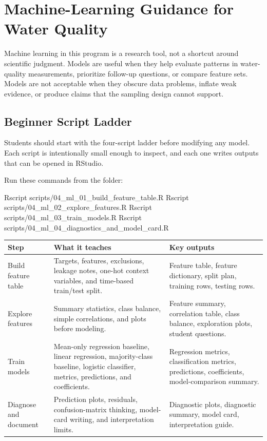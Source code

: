 \chapter{Machine-Learning Guidance for Water Quality}

Machine learning in this program is a research tool, not a shortcut around scientific judgment. Models are useful when they help evaluate patterns in water-quality measurements, prioritize follow-up questions, or compare feature sets. Models are not acceptable when they obscure data problems, inflate weak evidence, or produce claims that the sampling design cannot support.

\section{Beginner Script Ladder}

Students should start with the four-script ladder before modifying any model. Each script is intentionally small enough to inspect, and each one writes outputs that can be opened in RStudio.

Run these commands from the  folder:

\begin{rcode}
Rscript scripts/04_ml_01_build_feature_table.R
Rscript scripts/04_ml_02_explore_features.R
Rscript scripts/04_ml_03_train_models.R
Rscript scripts/04_ml_04_diagnostics_and_model_card.R
\end{rcode}

\begin{longtable}{p{}p{}p{}}
\toprule
\textbf{Step} & \textbf{What it teaches} & \textbf{Key outputs} \\
\midrule
Build feature table & Targets, features, exclusions, leakage notes, one-hot context variables, and time-based train/test split. & Feature table, feature dictionary, split plan, training rows, testing rows. \\
Explore features & Summary statistics, class balance, simple correlations, and plots before modeling. & Feature summary, correlation table, class balance, exploration plots, student questions. \\
Train models & Mean-only regression baseline, linear regression, majority-class baseline, logistic classifier, metrics, predictions, and coefficients. & Regression metrics, classification metrics, predictions, coefficients, model-comparison summary. \\
Diagnose and document & Prediction plots, residuals, confusion-matrix thinking, model-card writing, and interpretation limits. & Diagnostic plots, diagnostic summary, model card, interpretation guide. \\
\bottomrule
\end{longtable}

